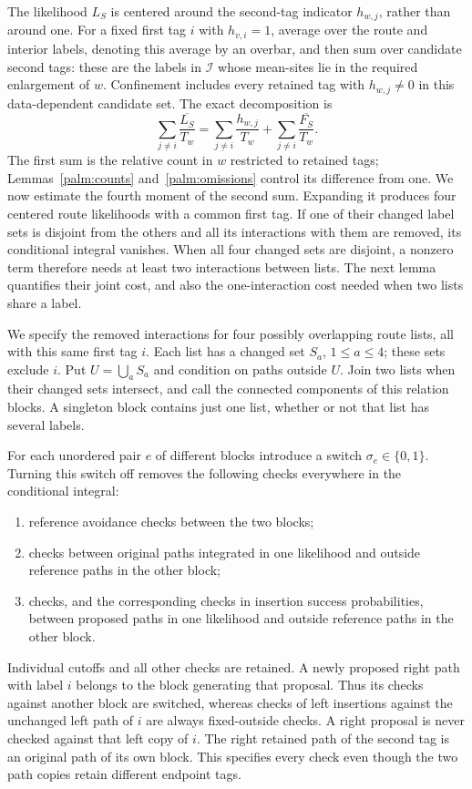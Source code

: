 The likelihood $L_S$ is centered around the second-tag indicator
$h_{w,j}$, rather than around one.  For a fixed first tag $i$ with
$h_{v,i}=1$, average
over the route and interior labels, denoting this average by an overbar,
and then sum over candidate second tags: these are the labels in
$\mathcal I$ whose mean-sites lie in the required enlargement of $w$.
Confinement includes every retained tag with $h_{w,j}\ne0$ in this
data-dependent candidate set.
The exact decomposition is
\[
 \sum_{j\ne i}\frac{\overline{L_S}}{T_w}
 =\sum_{j\ne i}\frac{h_{w,j}}{T_w}
       +\sum_{j\ne i}\frac{\overline{F_S}}{T_w}.
\]
The first sum is the relative count in $w$ restricted to retained tags;
Lemmas~\ref{palm:counts} and~\ref{palm:omissions} control its difference
from one.  We now estimate the fourth moment of the second sum.
Expanding it produces four centered route likelihoods with a common
first tag.  If one of their changed label sets is disjoint from the
others and all its interactions with them are removed, its conditional
integral vanishes.  When all four changed sets are disjoint, a nonzero
term therefore needs at least two interactions between lists.  The
next lemma quantifies their joint cost, and also the one-interaction
cost needed when two lists share a label.

We specify the removed interactions for four possibly overlapping
route lists, all with this same first tag $i$.
Each list has a changed set $S_a$, $1\le a\le4$; these
sets exclude $i$.  Put $U=\bigcup_aS_a$ and condition on paths outside
$U$.  Join two lists when their changed sets intersect, and call the
connected components of this relation blocks.  A singleton block
contains just one list, whether or not that list has several labels.

For each unordered pair $e$ of different blocks introduce a switch
$\sigma_e\in\{0,1\}$.  Turning this switch off removes the following
checks everywhere in the conditional integral:
\begin{enumerate}
\item reference avoidance checks between the two blocks;
\item checks between original paths integrated in one likelihood and
outside reference paths in the other block;
\item checks, and the corresponding checks in insertion success
probabilities, between proposed paths in one likelihood and outside
reference paths in the other block.
\end{enumerate}
Individual cutoffs and all other checks are retained.  A newly proposed
right path with label $i$ belongs to the block generating that proposal.
Thus its checks against another block are switched, whereas checks of left insertions
against the unchanged left path of $i$ are always fixed-outside checks.
A right proposal is never checked against that left copy of $i$.
The right retained path of the second tag is an original path of its
own block.  This specifies every check even though the two path copies
retain different endpoint tags.

